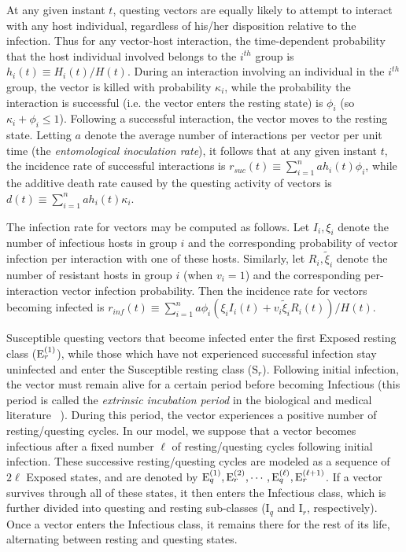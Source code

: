 \documentclass[a4paper]{article}
\newcommand{\dsum}{\displaystyle\sum}
\newcommand{\varpiVar}{r_{suc}}
\begin{document}
At any given instant $t$, questing vectors are equally likely to attempt to interact with any host individual, regardless of his/her disposition relative to the infection.
 Thus for any vector-host interaction, the time-dependent probability that the  host individual involved belongs to the $i^{th}$ group is 
$h_i(t)\equiv{H_i(t)}/{H(t)}$.  During an interaction involving an individual in the $i^{th}$ group, the  vector is killed with probability $\kappa_i$, while the probability the interaction is successful (i.e. the vector enters the resting state) is $\phi_i$ (so $\kappa_i + \phi_i \leqslant 1$).  Following a successful interaction, the vector moves to the resting state.
Letting $a$ denote the average number of interactions per vector per unit time (the {\em entomological  inoculation rate}), it follows that  at any given instant $t$, the incidence rate of successful interactions is $\varpiVar (t) \equiv \dsum_{i=1}^nah_i(t)\phi_i$, 
while the  additive death rate caused by the questing activity of vectors is $d(t)\equiv\dsum_{i=1}^nah_i(t)\kappa_i$. 

The infection rate for vectors may be computed as follows.
Let $I_i, \xi_i$ denote the number of infectious hosts in group $i$ and the corresponding probability of vector infection per interaction with one of these hosts. Similarly, let $R_i,\widetilde\xi_i$ denote  the number of resistant hosts in group $i$ (when $v_i = 1$) and the corresponding per-interaction vector infection probability.  Then the incidence rate for vectors becoming infected  is $r_{inf} (t) \equiv {\dsum_{i=1}^n} a\phi_i(\xi_i{I_i(t)}+v_i \widetilde\xi_i{R_i(t)})/{H(t)}$. 

Susceptible questing vectors that become infected enter the first Exposed resting class ($\mathrm{E}_r^{(\text 1)}$), while those which have not experienced successful infection stay uninfected and enter the Susceptible resting class ($\mathrm{S}_r$). Following initial infection, the vector must remain alive for a certain period before becoming Infectious (this period is called the {\em extrinsic incubation period} in the biological and medical literature ~\cite{010047862}).
During this period, the vector experiences a positive number of resting/questing cycles. In our model, we suppose that a vector becomes infectious after a fixed number $\ell$ of resting/questing cycles following initial infection.  These successive resting/questing cycles are modeled as a sequence of $2\ell$ Exposed states, and are denoted by $ \mathrm{E}^{(\text 1)}_q,\mathrm{E}^{(\text 2)}_r, \cdots, \mathrm{E}^{(\ell)}_q,\mathrm{E}^{(\ell+1)}_r$. If a vector survives through all of these states, it then enters the Infectious class, which is further divided into questing and resting sub-classes ($\mathrm{I}_q$ and $\mathrm{I}_r$, respectively). Once a vector enters the Infectious class, it remains there for the rest of its life, alternating between resting and questing states.
\end{document}
